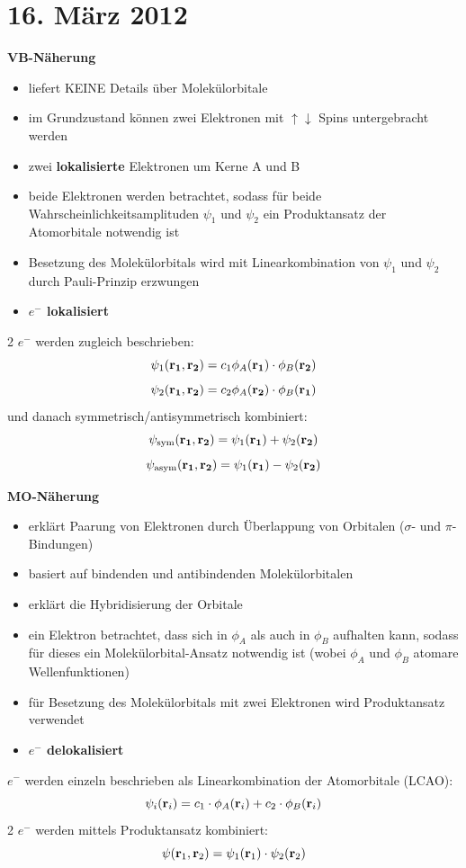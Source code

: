 \section{16. März 2012}

\label{q:41}

\textbf{VB-Näherung}
\begin{itemize}  
    \item liefert KEINE Details über Molekülorbitale
    \item im Grundzustand können zwei Elektronen mit $\uparrow \downarrow$ Spins untergebracht werden
    \item zwei \textbf{lokalisierte} Elektronen um Kerne A und B
    \item beide Elektronen werden betrachtet, sodass für beide Wahrscheinlichkeitsamplituden $\psi_1$ und $\psi_2$ ein Produktansatz der Atomorbitale notwendig ist
    \item Besetzung des Molekülorbitals wird mit Linearkombination von $\psi_1$ und $\psi_2$ durch Pauli-Prinzip erzwungen
    \item \textbf{$e^-$ lokalisiert}
\end{itemize}
2 $e^-$ werden zugleich beschrieben:
\[\psi_1(\vb{r_1},\vb{r_2}) = c_1 \phi_A(\vb{r_1}) \cdot \phi_B(\vb{r_2})\]
\[\psi_2(\vb{r_1},\vb{r_2}) = c_2 \phi_A(\vb{r_2}) \cdot \phi_B(\vb{r_1})\]
und danach symmetrisch/antisymmetrisch kombiniert: 
\[\psi_{\text{sym}} (\vb{r_1},\vb{r_2}) = \psi_1(\vb{r_1}) + \psi_2(\vb{r_2})\]
\[\psi_{\text{asym}}(\vb{r_1},\vb{r_2}) = \psi_1(\vb{r_1}) - \psi_2(\vb{r_2})\]

\noindent
\textbf{MO-Näherung}
\begin{itemize}
    \item erklärt Paarung von Elektronen durch Überlappung von Orbitalen ($\sigma$- und $\pi$-Bindungen)
    \item basiert auf bindenden und antibindenden Molekülorbitalen
    \item erklärt die Hybridisierung der Orbitale
    \item ein Elektron betrachtet, dass sich in $\phi_A$ als auch in $\phi_B$ aufhalten kann, sodass für dieses ein Molekülorbital-Ansatz notwendig ist (wobei $\phi_A$ und $\phi_B$ atomare Wellenfunktionen)
    \item für Besetzung des Molekülorbitals mit zwei Elektronen wird Produktansatz verwendet
    \item \textbf{$e^-$ delokalisiert}
\end{itemize}
$e^-$ werden einzeln beschrieben als Linearkombination der Atomorbitale (LCAO):
\[\psi_i(\vb{r}_i) = c_1 \cdot \phi_A(\vb{r}_i) + c_2 \cdot \phi_B(\vb{r}_i)\]
2 $e^-$ werden mittels Produktansatz kombiniert:
\[\psi(\vb{r}_1,\vb{r}_2) = \psi_1(\vb{r}_1) \cdot \psi_2(\vb{r}_2) \]

